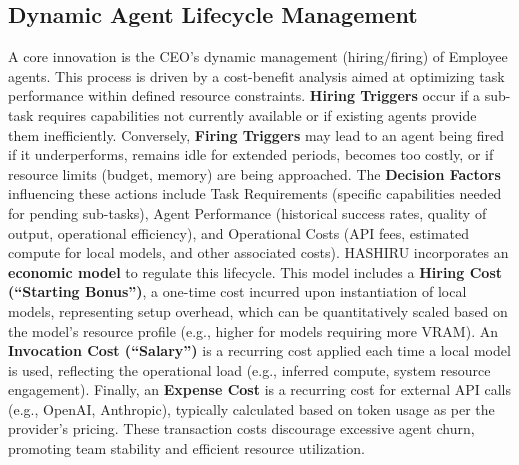 \documentclass[twocolumn]{article}
\begin{document}
\subsection{Dynamic Agent Lifecycle Management}
\label{subsec:tech_dynamic_mgmt}
A core innovation is the CEO's dynamic management (hiring/firing) of Employee agents. This process is driven by a cost-benefit analysis aimed at optimizing task performance within defined resource constraints.
\textbf{Hiring Triggers} occur if a sub-task requires capabilities not currently available or if existing agents provide them inefficiently. Conversely, \textbf{Firing Triggers} may lead to an agent being fired if it underperforms, remains idle for extended periods, becomes too costly, or if resource limits (budget, memory) are being approached.
The \textbf{Decision Factors} influencing these actions include Task Requirements (specific capabilities needed for pending sub-tasks), Agent Performance (historical success rates, quality of output, operational efficiency), and Operational Costs (API fees, estimated compute for local models, and other associated costs).
HASHIRU incorporates an \textbf{economic model} to regulate this lifecycle. This model includes a \textbf{Hiring Cost (``Starting Bonus'')}, a one-time cost incurred upon instantiation of local models, representing setup overhead, which can be quantitatively scaled based on the model's resource profile (e.g., higher for models requiring more VRAM). An \textbf{Invocation Cost (``Salary'')} is a recurring cost applied each time a local model is used, reflecting the operational load (e.g., inferred compute, system resource engagement). Finally, an \textbf{Expense Cost} is a recurring cost for external API calls (e.g., OpenAI, Anthropic), typically calculated based on token usage as per the provider's pricing. These transaction costs discourage excessive agent churn, promoting team stability and efficient resource utilization.
\end{document}
